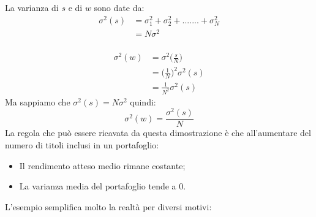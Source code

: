 La varianza di  $s$ e di $w$ sono date da:
\begin{equation}
\begin{split}
\sigma^{2}(s) & = \sigma^{2}_1+\sigma^{2}_2 +.......+ \sigma^{2}_N\\
& = N \sigma^{2}\\
\end{split}
\end{equation}

\begin{equation}
\begin{split}
\sigma^{2}(w) & =\sigma^{2}\bigg(\frac{s}{N}\bigg) \\
& =\bigg(\frac{1}{N}\bigg)^2 \sigma^{2}(s)\\
& =\frac{1}{N^2} \sigma^{2}(s)
\end{split}
\end{equation}
Ma sappiamo che $\sigma^{2}(s) = N \sigma^{2}$ quindi:
\begin{equation}
\sigma^{2}(w)=\frac{\sigma^{2}(s)}{N} 
\nonumber
\end{equation}
La regola che può essere ricavata da questa dimostrazione è che all'aumentare del numero di titoli inclusi in un portafoglio: 
\begin{itemize}
	\item Il rendimento atteso medio rimane costante;
	\item La varianza media del portafoglio tende a 0.
\end{itemize} 
L'esempio semplifica molto la realtà per diversi motivi:
